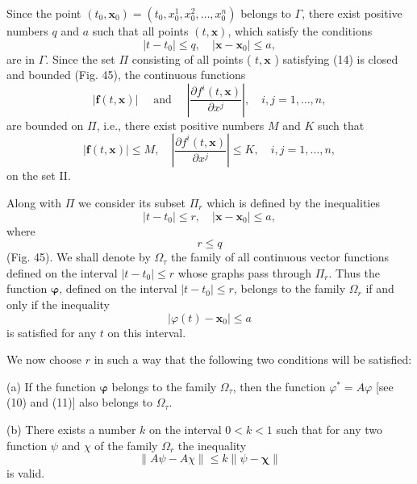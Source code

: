 \documentclass[10pt,a5paper]{book}
\makeatletter
\theoremstyle{plain}
\theoremstyle{definition}
\theoremstyle{remark}
\renewenvironment{proof}[1][\proofname]{\par
  \pushQED{\qed}%
  \normalfont\topsep6\p@\@plus6\p@\relax
  \trivlist
  \item\relax{\itshape #1\@addpunct{.}}\hspace\labelsep\ignorespaces
}{\popQED\endtrivlist\@endpefalse}
\makeatother
\begin{document}
\begin{proof}[Proof of Theorem 2]
Since the point $\left(t_{0}, \mathbf{x}_{0}\right)=\left(t_{0}, x_{0}^{1}, x_{0}^{2}, \ldots, x_{0}^{n}\right)$ belongs to $\Gamma$, there exist positive numbers $q$ and $a$ such that all points $(t, \mathbf{x})$, which satisfy the conditions
\begin{equation*}
\left|t-t_{0}\right| \leq q, \quad\left|\mathbf{x}-\mathbf{x}_{0}\right| \leq a, \tag{14}
\end{equation*}
are in $\Gamma$. Since the set $\Pi$ consisting of all points ( $t, \mathbf{x}$ ) satisfying (14) is closed and bounded (Fig. 45), the continuous functions
\[
|\mathbf{f}(t, \mathbf{x})| \quad \text { and } \quad\left|\frac{\partial f^{i}(t, \mathbf{x})}{\partial x^{j}}\right|, \quad i, j=1, \ldots, n,
\]
are bounded on $\Pi$, i.e., there exist positive numbers $M$ and $K$ such that
\begin{equation*}
|\mathbf{f}(t, \mathbf{x})| \leq M, \quad\left|\frac{\partial f^{i}(t, \mathbf{x})}{\partial x^{j}}\right| \leq K, \quad i, j=1, \ldots, n, \tag{15}
\end{equation*}
on the set II.

Along with $\Pi$ we consider its subset $\Pi_{r}$ which is defined by the inequalities
\[
\left|t-t_{0}\right| \leq r, \quad\left|\mathbf{x}-\mathbf{x}_{0}\right| \leq a,
\]
where
\begin{equation*}
r \leq q \tag{16}
\end{equation*}
(Fig. 45). We shall denote by $\Omega_{\tau}$ the family of all continuous vector functions defined on the interval $\left|t-t_{0}\right| \leq r$ whose graphs pass through $\Pi_{r}$. Thus the function $\boldsymbol{\varphi}$, defined on the interval $\left|t-t_{0}\right| \leq r$, belongs to the family $\Omega_{r}$ if and only if the inequality
\begin{equation*}
\left|\varphi(t)-\mathbf{x}_{0}\right| \leq a \tag{17}
\end{equation*}
is satisfied for any $t$ on this interval.

We now choose $r$ in such a way that the following two conditions will be satisfied:

(a) If the function $\boldsymbol{\varphi}$ belongs to the family $\Omega_{\tau}$, then the function $\varphi^{*}=A \varphi$ [see (10) and (11)] also belongs to $\Omega_{\tau}$.

(b) There exists a number $k$ on the interval $0<k<1$ such that for any two function $\psi$ and $\chi$ of the family $\Omega_{r}$ the inequality
\begin{equation*}
\|A \psi-A \chi\| \leq k\|\psi-\mathbf{\chi}\| \tag{18}
\end{equation*}
is valid.


\end{proof}
\end{document}
